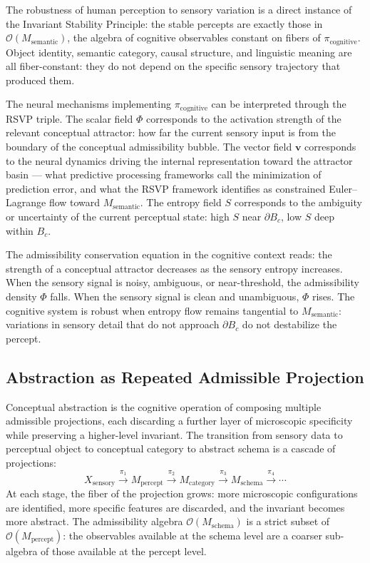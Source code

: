 \documentclass[12pt, a4paper]{article}
\theoremstyle{essaystyle}
\begin{document}
The robustness of human perception to sensory variation is a direct instance of the
Invariant Stability Principle: the stable percepts are exactly those in
$\mathcal{O}(M_{\mathrm{semantic}})$, the algebra of cognitive observables constant
on fibers of $\pi_{\mathrm{cognitive}}$. Object identity, semantic category, causal
structure, and linguistic meaning are all fiber-constant: they do not depend on the
specific sensory trajectory that produced them.

The neural mechanisms implementing $\pi_{\mathrm{cognitive}}$ can be interpreted
through the RSVP triple. The scalar field $\Phi$ corresponds to the activation strength
of the relevant conceptual attractor: how far the current sensory input is from the
boundary of the conceptual admissibility bubble. The vector field $\mathbf{v}$
corresponds to the neural dynamics driving the internal representation toward the
attractor basin --- what predictive processing frameworks call the minimization of
prediction error, and what the RSVP framework identifies as constrained Euler--Lagrange
flow toward $M_{\mathrm{semantic}}$. The entropy field $S$ corresponds to the
ambiguity or uncertainty of the current perceptual state: high $S$ near $\partial B_c$,
low $S$ deep within $B_c$.

The admissibility conservation equation in the cognitive context reads: the strength
of a conceptual attractor decreases as the sensory entropy increases. When the sensory
signal is noisy, ambiguous, or near-threshold, the admissibility density $\Phi$ falls.
When the sensory signal is clean and unambiguous, $\Phi$ rises. The cognitive system
is robust when entropy flow remains tangential to $M_{\mathrm{semantic}}$: variations
in sensory detail that do not approach $\partial B_c$ do not destabilize the percept.

\subsection{Abstraction as Repeated Admissible Projection}

Conceptual abstraction is the cognitive operation of composing multiple admissible
projections, each discarding a further layer of microscopic specificity while
preserving a higher-level invariant. The transition from sensory data to perceptual
object to conceptual category to abstract schema is a cascade of projections:
\[
X_{\mathrm{sensory}}
\xrightarrow{\pi_1} M_{\mathrm{percept}}
\xrightarrow{\pi_2} M_{\mathrm{category}}
\xrightarrow{\pi_3} M_{\mathrm{schema}}
\xrightarrow{\pi_4} \cdots
\]
At each stage, the fiber of the projection grows: more microscopic configurations are
identified, more specific features are discarded, and the invariant becomes more
abstract. The admissibility algebra $\mathcal{O}(M_{\mathrm{schema}})$ is a strict
subset of $\mathcal{O}(M_{\mathrm{percept}})$: the observables available at the
schema level are a coarser sub-algebra of those available at the percept level.
\end{document}
